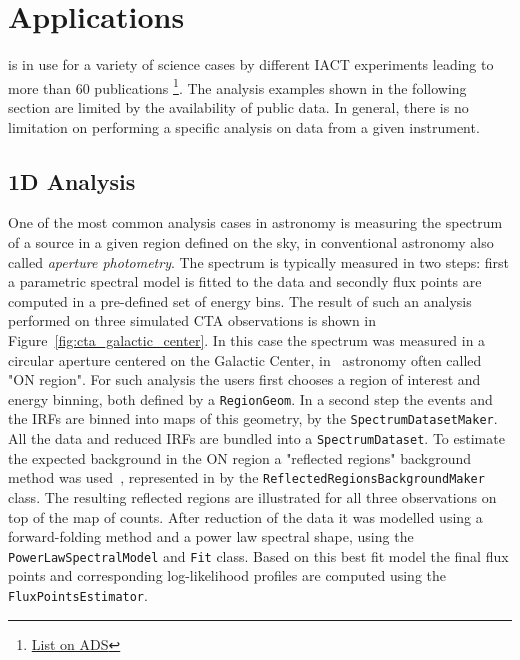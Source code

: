 \documentclass[traditabstract, longauth]{aa}
\newcommand{\code}[1]{\texttt{#1}}
\begin{document}


\section{Applications}
\label{sec:applications}

\gammapy is in use for a variety of science cases by different IACT
experiments leading to more than 60 publications
\footnote{\href{https://ui.adsabs.harvard.edu/search/q=(\%20(citations(doi\%3A\%2210.1051\%2F0004-6361\%2F201834938\%22)\%20OR\%20citations(bibcode\%3A2017ICRC...35..766D))\%20AND\%20year\%3A2014-2023)&sort=date\%20desc\%2C\%20bibcode\%20desc&p_=0}{List on ADS}}.
The analysis examples shown in the following section are limited by the availability
of public data. In general, there is no limitation on performing a specific analysis
on data from a given instrument.


\subsection{1D Analysis}
\label{ssec:1d-analysis}
One of the most common analysis cases in \gammaray astronomy is measuring the
spectrum of a source in a given region defined on the sky, in conventional
astronomy also called \textit{aperture photometry}. The spectrum is typically measured
in two steps: first a parametric spectral model is fitted to the data and
secondly flux points are computed in a pre-defined set of energy bins. The
result of such an analysis performed on three simulated CTA observations is
shown in Figure~\ref{fig:cta_galactic_center}. In this case the spectrum was
measured in a circular aperture centered on the Galactic Center, in
\gammaray~astronomy often called "ON region". For such analysis the users first
chooses a region of interest and energy binning, both defined by a
\code{RegionGeom}. In a second step the events and the IRFs are binned
into maps of this geometry, by the \code{SpectrumDatasetMaker}. All the data and
reduced IRFs are bundled into a \code{SpectrumDataset}. To estimate
the expected background in the ON region a "reflected regions" background
method was used~\cite{Berge07}, represented in \gammapy by the
\code{ReflectedRegionsBackgroundMaker} class. The resulting reflected regions are
illustrated for all three observations on top of the map of counts. After
reduction of the data it was modelled using a forward-folding method and a
power law spectral shape, using the \code{PowerLawSpectralModel} and \code{Fit} class.
Based on this best fit model the final flux points and corresponding
log-likelihood profiles are computed using the \code{FluxPointsEstimator}.
\end{document}
